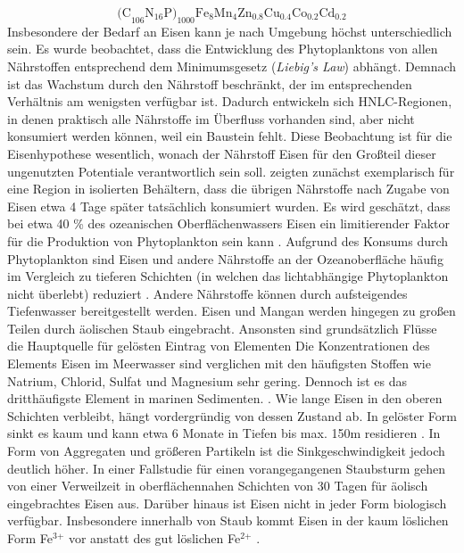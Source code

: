 \documentclass[12pt,a4paper,onecolumn]{scrartcl}
\begin{document}
\begin{equation}
\text{(C}_{106} \text{N}_{16} \text{P)}_{1000} \text{Fe}_8\text{Mn}_4\text{Zn}_{0.8}\text{Cu}_{0.4}\text{Co}_{0.2} \text{Cd}_{0.2}
\end{equation}
Insbesondere der Bedarf an Eisen kann je nach Umgebung höchst unterschiedlich sein. Es wurde beobachtet, dass die Entwicklung des Phytoplanktons von allen Nährstoffen entsprechend dem Minimumsgesetz (\textit{Liebig's Law}) abhängt. Demnach ist das Wachstum durch den Nährstoff beschränkt, der im entsprechenden Verhältnis am wenigsten verfügbar ist. Dadurch entwickeln sich HNLC-Regionen, in denen praktisch alle Nährstoffe im Überfluss vorhanden sind, aber nicht konsumiert werden können, weil ein Baustein fehlt. Diese Beobachtung ist für die Eisenhypothese wesentlich, wonach der Nährstoff Eisen für den Großteil dieser ungenutzten Potentiale verantwortlich sein soll. \citet{Martin.1988} zeigten zunächst exemplarisch für eine Region in isolierten Behältern, dass die übrigen Nährstoffe nach Zugabe von Eisen etwa 4 Tage später tatsächlich konsumiert wurden. Es wird geschätzt, dass bei etwa 40 \% des ozeanischen Oberflächenwassers Eisen ein limitierender Faktor für die Produktion von Phytoplankton sein kann \citep{Emerson.2009}. Aufgrund des Konsums durch Phytoplankton sind Eisen und andere Nährstoffe  an der Ozeanoberfläche häufig im Vergleich zu tieferen Schichten (in welchen das lichtabhängige Phytoplankton nicht überlebt) reduziert \citep{Martin.1990}. Andere Nährstoffe  können durch aufsteigendes Tiefenwasser bereitgestellt werden. Eisen und Mangan werden hingegen zu großen Teilen durch äolischen Staub eingebracht. Ansonsten sind grundsätzlich Flüsse die Hauptquelle für gelösten Eintrag von Elementen \citep{Emerson.2009} Die Konzentrationen des Elements Eisen im Meerwasser sind verglichen mit den häufigsten Stoffen wie Natrium, Chlorid, Sulfat und Magnesium sehr gering. Dennoch ist es das dritthäufigste Element in marinen Sedimenten. \citep{Emerson.2009}. Wie lange Eisen in den oberen Schichten verbleibt, hängt vordergründig von dessen Zustand ab. In gelöster Form sinkt es kaum und kann etwa 6 Monate in Tiefen bis max. 150m residieren \citep{Hayes.2015}. In Form von Aggregaten und größeren Partikeln ist die Sinkgeschwindigkeit jedoch deutlich höher. In einer Fallstudie für einen vorangegangenen Staubsturm gehen \citet{Boyd.2010} von einer Verweilzeit in oberflächennahen Schichten von 30 Tagen für äolisch eingebrachtes Eisen aus. Darüber hinaus ist Eisen nicht in jeder Form biologisch verfügbar. Insbesondere innerhalb von Staub kommt Eisen in der kaum löslichen Form Fe$^\text{3+}$ vor anstatt des gut löslichen Fe$^\text{2+}$ \citep{Reynolds.2014}. \\
\end{document}
